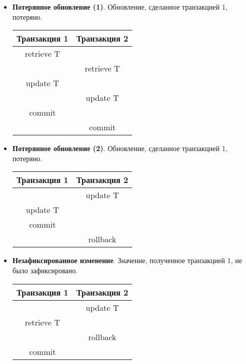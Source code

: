 \begin{itemize}
	\item \textbf{Потерянное обновление (1)}. Обновление, сделанное транзакцией 1, потеряно.
	      \begin{center}
		      \begin{tabular}{|c c|}
			      \hline
			      Транзакция 1 & Транзакция 2 \\
			      \hline
			      retrieve T   &              \\
			                   & retrieve T   \\
			      update T     &              \\
			                   & update T     \\
			      commit       &              \\
			                   & commit       \\
			      \hline
		      \end{tabular}
	      \end{center}
	\item \textbf{Потерянное обновление (2)}. Обновление, сделанное транзакцией 1, потеряно.
	      \begin{center}
		      \begin{tabular}{|c c|}
			      \hline
			      Транзакция 1 & Транзакция 2 \\
			      \hline
			                   & update T     \\
			      update T     &              \\
			      commit       &              \\
			                   & rollback     \\
			      \hline
		      \end{tabular}
	      \end{center}
	\item \textbf{Незафиксированное изменение}. Значение, полученное транзакцией 1, не было
	      зафиксировано.
	      \begin{center}
		      \begin{tabular}{|c c|}
			      \hline
			      Транзакция 1 & Транзакция 2 \\
			      \hline
			                   & update T     \\
			      retrieve T   &              \\
			                   & rollback     \\
			      commit       &              \\
			      \hline

\end{tabular}
\end{center}
\end{itemize}
